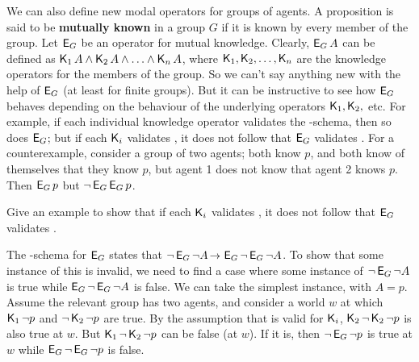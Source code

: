 \iffalse
  
We can also define new modal operators for groups of agents. A proposition is
said to be \textbf{mutually known} in a group $G$ if it is known by every member
of the group. Let $\operatorname{\mathsf{E}}_G$ be an operator for mutual knowledge. Clearly,
$\operatorname{\mathsf{E}}_G A$ can be defined as $\operatorname{\mathsf{K}{}}_1 A \land \operatorname{\mathsf{K}{}}_2 A \land \ldots \land \operatorname{\mathsf{K}{}}_n A$,
where $\operatorname{\mathsf{K}{}}_1, \operatorname{\mathsf{K}{}}_2, \ldots, \operatorname{\mathsf{K}{}}_n$ are the knowledge operators for the members
of the group. So we can't say anything new with the help of $\operatorname{\mathsf{E}}_G$ (at least
for finite groups). But it can be instructive to see how $\operatorname{\mathsf{E}}_G$ behaves
depending on the behaviour of the underlying operators $\operatorname{\mathsf{K}{}}_1,\operatorname{\mathsf{K}{}}_2,$ etc. For
example, if each individual knowledge operator validates the -schema, then
so does $\operatorname{\mathsf{E}}_G$; but if each $\operatorname{\mathsf{K}{}}_i$ validates ,
it does not follow that $\operatorname{\mathsf{E}}_G$ validates . For a counterexample, consider
a group of two agents; both know $p$, and both know of themselves that they know
$p$, but agent 1 does not know that agent 2 knows $p$. Then $\operatorname{\mathsf{E}}_G p$ but
$\neg \operatorname{\mathsf{E}}_G \operatorname{\mathsf{E}}_G p$.

\begin{exercise}
  Give an example to show that if each $\operatorname{\mathsf{K}{}}_i$ validates ,
  it does not follow that $\operatorname{\mathsf{E}}_G$ validates .
\end{exercise}
\begin{solution}
  The -schema for $\operatorname{\mathsf{E}}_G$ states that
  $\neg \EKn_G \neg A \to \EKn_G \neg \EKn_G \neg A$. To show that some instance
  of this is invalid, we need to find a case where some instance of
  $\neg \operatorname{\mathsf{E}}_G \neg A$ is true while $\operatorname{\mathsf{E}}_G \neg \operatorname{\mathsf{E}}_G \neg A$ is false. We
  can take the simplest instance, with $A=p$. Assume the relevant group has two
  agents, and consider a world $w$ at which $\operatorname{\mathsf{K}{}}_1 \neg p$ and
  $\neg \operatorname{\mathsf{K}{}}_2 \neg p$ are true. By the assumption that  is valid for
  $\operatorname{\mathsf{K}{}}_i$, $\operatorname{\mathsf{K}{}}_2\neg\operatorname{\mathsf{K}{}}_2\neg p$ is also true at $w$. But
  $\operatorname{\mathsf{K}{}}_1\neg \operatorname{\mathsf{K}{}}_2\neg p$ can be false (at $w$). If it is, then
  $\neg \operatorname{\mathsf{E}}_G \neg p$ is true at $w$ while $\operatorname{\mathsf{E}}_G \neg \operatorname{\mathsf{E}}_G \neg p$ is
  false.
\end{solution}


